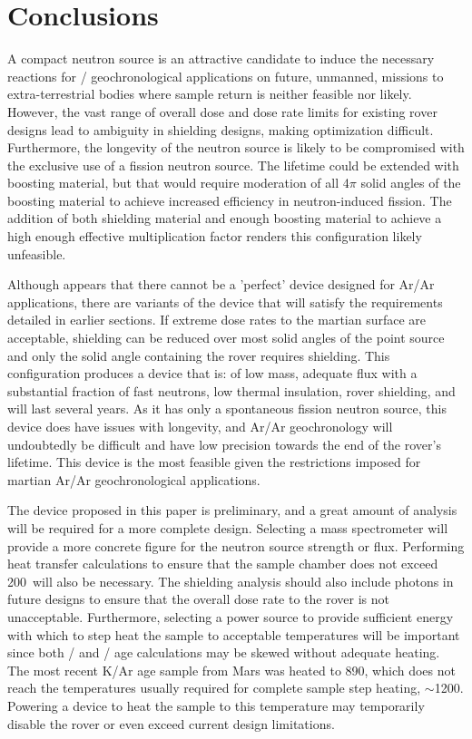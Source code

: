 \documentclass{mc2015}
\begin{document}
\section{Conclusions}
\label{sec:conclusions}

A compact neutron source is an attractive candidate to induce the necessary reactions for  /  geochronological applications on future, unmanned, missions to extra-terrestrial bodies where sample return is neither feasible nor likely. However, the vast range of overall dose and dose rate limits for existing rover designs lead to ambiguity in shielding designs, making optimization difficult. Furthermore, the longevity of the neutron source is likely to be compromised with the  exclusive use of a  fission neutron source. The lifetime could be extended with boosting material, but that would require moderation of all 4$\pi$ solid angles of the boosting material to achieve increased efficiency in neutron-induced fission. The addition of both shielding material and enough boosting material to achieve a high enough effective multiplication factor renders this configuration likely unfeasible.

Although appears that there cannot be a 'perfect' device designed for Ar/Ar applications, there are variants of the device that will satisfy the requirements detailed in earlier sections. If extreme dose rates to the martian surface are acceptable, shielding can be reduced over most solid angles of the point source and only the solid angle containing the rover requires shielding. This configuration produces a device that is: of low mass, adequate flux with a substantial fraction of fast neutrons, low thermal insulation, rover shielding, and will last several years. As it has only a spontaneous fission neutron source, this device does have issues with longevity, and Ar/Ar geochronology will undoubtedly be difficult and have low precision towards the end of the rover's lifetime. This device is the most feasible given the restrictions imposed for martian Ar/Ar geochronological applications. 

The device proposed in this paper is preliminary, and a great amount of analysis will be required for a more complete design. Selecting a mass spectrometer will provide a more concrete figure for the neutron source strength or flux. Performing heat transfer calculations to ensure that the sample chamber does not exceed 200\celsius\  will also be necessary. The shielding analysis should also include photons in future designs to ensure that the overall dose rate to the rover is not unacceptable. Furthermore, selecting a power source to provide sufficient energy with which to step heat the sample to acceptable temperatures will be important since both / and / age calculations may be skewed without adequate heating. The most recent K/Ar age sample from Mars was heated to 890\celsius \cite{farley_situ_2014}, which does not reach the temperatures usually required for complete sample step heating, $\sim$1200\celsius \cite{mcdougall_geochronology_1999}. Powering a device to heat the sample to this temperature may temporarily disable the rover or even exceed current design limitations.
\end{document}
